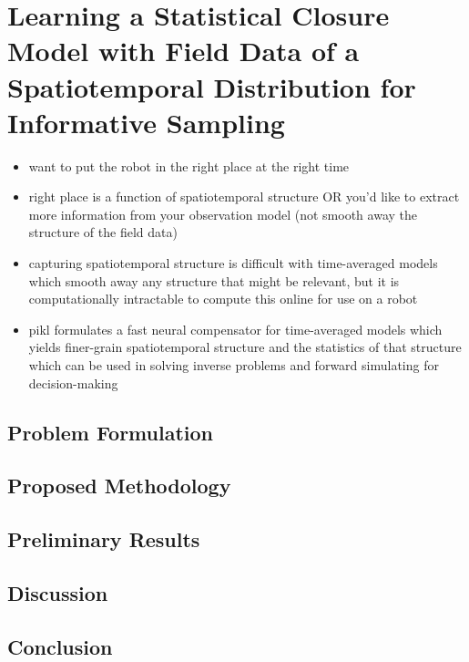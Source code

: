 \chapter{Learning a Statistical Closure Model with Field Data of a Spatiotemporal Distribution for Informative Sampling}
\begin{itemize}
    \item want to put the robot in the right place at the right time
    \item right place is a function of spatiotemporal structure OR you'd like to extract more information from your observation model (not smooth away the structure of the field data)
    \item capturing spatiotemporal structure is difficult with time-averaged models which smooth away any structure that might be relevant, but it is computationally intractable to compute this online for use on a robot
    \item pikl formulates a fast neural compensator for time-averaged models which yields finer-grain spatiotemporal structure and the statistics of that structure which can be used in solving inverse problems and forward simulating for decision-making 
\end{itemize}

\section{Problem Formulation}

\section{Proposed Methodology}

\section{Preliminary Results}

\section{Discussion}

\section{Conclusion}

